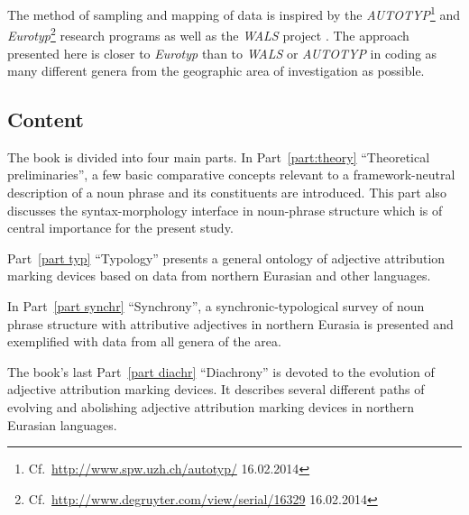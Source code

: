The method of sampling and mapping of data is inspired by the \emph{AUTOTYP}\footnote{Cf.~\url{http://www.spw.uzh.ch/autotyp/} 16.02.2014} and \emph{Eurotyp}\footnote{Cf.~\url{http://www.degruyter.com/view/serial/16329} 16.02.2014} research programs as well as the \emph{WALS} project \citep{walsOnline2013}. The approach presented here is closer to \emph{Eurotyp} than to \emph{WALS} or \emph{AUTOTYP} in coding as many different genera from the geographic area of investigation as possible.

\subsection*{Content}
The book is divided into four main parts. In Part~\ref{part:theory} “Theoretical preliminaries”, a few basic comparative concepts relevant to a framework-neutral description of a noun phrase and its constituents are introduced. This part also discusses the syntax-morphology interface in noun-phrase structure which is of central importance for the present study.

Part~\ref{part typ} “Typology” presents a general ontology of adjective attribution marking devices based on data from northern Eurasian and other languages.

In Part~\ref{part synchr} “Synchrony”, a synchronic-typological survey of noun phrase structure with attributive adjectives in northern Eurasia is presented and exemplified with data from all genera of the area.

The book's last Part~\ref{part diachr} “Diachrony” is devoted to the evolution of adjective attribution marking devices. It describes several different paths of evolving and abolishing adjective attribution marking devices in northern Eurasian languages.
